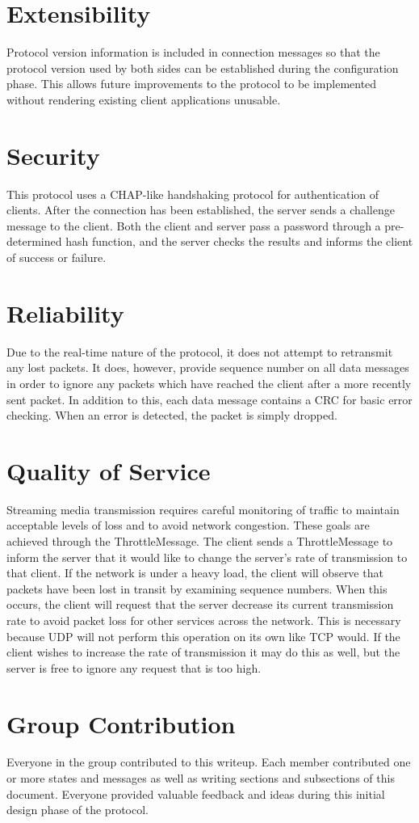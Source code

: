 \documentclass[12pt,letterpaper,titlepage]{article}
\begin{document}

\section{Extensibility}
Protocol version information is included in connection messages so that the protocol version used by both sides can be established during the configuration phase.  This allows future improvements to the protocol to be implemented without rendering existing client applications unusable.

\section{Security}
\label{sec:security}
This protocol uses a CHAP-like handshaking protocol for authentication of clients.  After the connection has been established, the server sends a challenge message to the client.  Both the client and server pass a password through a pre-determined hash function, and the server checks the results and informs the client of success or failure.

\section{Reliability}
Due to the real-time nature of the protocol, it does not attempt to retransmit any lost packets. It does, however, provide sequence number on all data messages in order to ignore any packets which have reached the client after a more recently sent packet. In addition to this, each data message contains a CRC for basic error checking. When an error is detected, the packet is simply dropped.

\section{Quality of Service}
Streaming media transmission requires careful monitoring of traffic to maintain acceptable levels of loss and to avoid network congestion. These goals are achieved through the ThrottleMessage. The client sends a ThrottleMessage to inform the server that it would like to change the server's rate of transmission to that client. If the network is under a heavy load, the client will observe that packets have been lost in transit by examining sequence numbers. When this occurs, the client will request that the server decrease its current transmission rate to avoid packet loss for other services across the network. This is necessary because UDP will not perform this operation on its own like TCP would. If the client wishes to increase the rate of transmission it may do this as well, but the server is free to ignore any request that is too high.

\section{Group Contribution}
Everyone in the group contributed to this writeup. Each member contributed one or more states and messages as well as writing sections and subsections of this document. Everyone provided valuable feedback and ideas during this initial design phase of the protocol.
\end{document}
